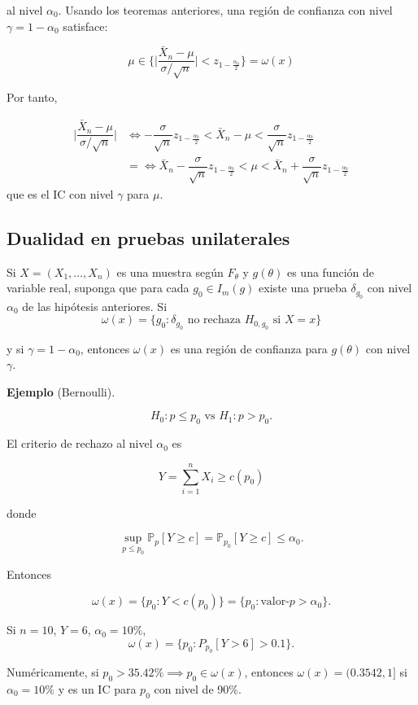 \documentclass[
  12pt,
]{book}
\begin{document}
al nivel \(\alpha_0\). Usando los teoremas anteriores, una región de confianza con nivel \(\gamma = 1-\alpha_0\) satisface:

\[\mu\in\bigg\{ \bigg|\dfrac{\bar X_n-\mu}{\sigma/\sqrt n}\bigg|< z_{1-\frac{\alpha_0}2}\bigg\} = \omega(x)\]

Por tanto,

\begin{align*}
 \bigg|\dfrac{\bar X_n-\mu}{\sigma/\sqrt n}\bigg| & \Leftrightarrow -\dfrac{\sigma}{\sqrt n}z_{1-\frac{\alpha_0}2}<\bar X_n  - \mu<\dfrac{\sigma}{\sqrt n}z_{1-\frac{\alpha_0}2}\\
 & = \Leftrightarrow \bar X_n-\dfrac{\sigma}{\sqrt n}z_{1-\frac{\alpha_0}2}< \mu<\bar X_n + \dfrac{\sigma}{\sqrt n}z_{1-\frac{\alpha_0}2}
\end{align*}
que es el IC con nivel \(\gamma\) para \(\mu\).

\hypertarget{dualidad-en-pruebas-unilaterales}{%
\subsection{Dualidad en pruebas unilaterales}\label{dualidad-en-pruebas-unilaterales}}

Si \(X = (X_1,\dots, X_n)\) es una muestra según \(F_\theta\) y \(g(\theta)\) es una función de variable real, suponga que para cada \(g_0\in I_m(g)\) existe una prueba \(\delta_{g_0}\) con nivel \(\alpha_0\) de las hipótesis anteriores. Si
\[\omega(x) = \{g_0: \delta_{g_0} \text{ no rechaza }H_{0,g_0}\text{ si }X=x\}\]

y si \(\gamma = 1-\alpha_0\), entonces \(\omega(x)\) es una región de confianza para \(g(\theta)\) con nivel \(\gamma\).

\textbf{Ejemplo} (Bernoulli).

\[ H_0: p \leq p_0 \text{ vs } H_1: p>p_0.\]

El criterio de rechazo al nivel \(\alpha_0\) es

\[Y = \sum_{i=1}^nX_i\geq c(p_0)\]

donde

\[\sup_{p\leq p_0} \mathbb P_p[Y\geq c] = \mathbb P_{p_0}[Y\geq c] \leq \alpha_0.\]

Entonces

\[\omega(x) = \{p_0: Y<c(p_0)\} = \{p_0: \text{valor-}p>\alpha_0\}.\]

Si \(n=10\), \(Y=6\), \(\alpha_0 = 10\%\),
\[\omega(x) =\{p_0: P_{p_0}[Y> 6] >0.1\}.\]

Numéricamente, si \(p_0 > 35.42\% \implies p_0 \in \omega(x)\), entonces \(\omega(x) = (0.3542,1]\) si \(\alpha_0=10\%\) y es un IC para \(p_0\) con nivel de 90\%.
\end{document}
